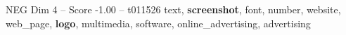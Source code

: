 \begin{textsample}{NEG Dim 4 – Score -1.00 – t011526}  \label{ex:f4_neg_018}
text, \textbf{screenshot}, font, number, website, web\_page, \textbf{logo}, multimedia, software, online\_advertising, advertising

\end{textsample}
